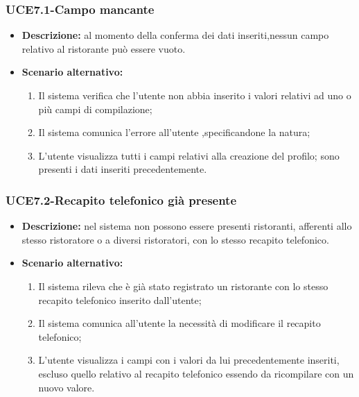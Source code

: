 \subsubsection{UCE7.1-Campo mancante}
\begin{itemize}
    \item \textbf{Descrizione: }al momento della conferma dei dati inseriti,nessun campo relativo al ristorante può essere vuoto.
    \item \textbf{Scenario alternativo:}
    \begin{enumerate}
        \item Il sistema verifica che l'utente non abbia inserito i valori relativi ad uno o più campi di
        compilazione;
        \item Il sistema comunica l'errore all'utente ,specificandone la natura;
        \item L'utente visualizza tutti i campi relativi alla creazione del profilo; sono presenti i dati inseriti precedentemente.
    \end{enumerate}
\end{itemize}

\subsubsection{UCE7.2-Recapito telefonico già presente}
\begin{itemize}
    \item \textbf{Descrizione: }nel sistema non possono essere presenti ristoranti, afferenti allo stesso ristoratore
    o a diversi ristoratori, con lo stesso recapito telefonico.
    \item \textbf{Scenario alternativo:}
    \begin{enumerate}
        \item Il sistema rileva che è già stato registrato un ristorante con lo stesso recapito telefonico
        inserito dall'utente;
        \item Il sistema comunica all'utente la necessità di modificare il recapito telefonico;
        \item L'utente visualizza i campi con i valori da lui precedentemente inseriti, escluso quello relativo al recapito telefonico
        essendo da ricompilare con un nuovo valore.
    \end{enumerate}
\end{itemize}

